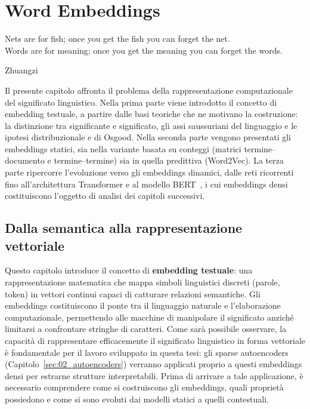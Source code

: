 \newpage

\section{Word Embeddings}
\label{sec:03_word_embeddings}
\epigraph{
    Nets are for fish; once you get the fish you can forget the net.\\
    Words are for meaning; once you get the meaning you can forget the words.
}{Zhuangzi}
Il presente capitolo affronta il problema della rappresentazione computazionale del significato linguistico. Nella prima parte viene introdotto il concetto di embedding testuale, a partire dalle basi teoriche che ne motivano la costruzione: la distinzione tra significante e significato, gli assi saussuriani del linguaggio e le ipotesi distribuzionale e di Osgood. Nella seconda parte vengono presentati gli embeddings statici, sia nella variante basata su conteggi (matrici termine--documento e termine--termine) sia in quella predittiva (Word2Vec). La terza parte ripercorre l'evoluzione verso gli embeddings dinamici, dalle reti ricorrenti fino all'architettura Transformer e al modello BERT~\parencite{devlin2018bert}, i cui embeddings densi costituiscono l'oggetto di analisi dei capitoli successivi.

\newpage

\subsection{Dalla semantica alla rappresentazione vettoriale}
\label{sec:semantics_to_vectors}

Questo capitolo introduce il concetto di \textbf{embedding testuale}: una rappresentazione matematica che mappa simboli linguistici discreti (parole, token) in vettori continui capaci di catturare relazioni semantiche. Gli embeddings costituiscono il ponte tra il linguaggio naturale e l'elaborazione computazionale, permettendo alle macchine di manipolare il significato anziché limitarsi a confrontare stringhe di caratteri.
Come sarà possibile osservare, la capacità di rappresentare efficacemente il significato linguistico in forma vettoriale è fondamentale per il lavoro sviluppato in questa tesi: gli sparse autoencoders (Capitolo~\ref{sec:02_autoencoders}) verranno applicati proprio a questi embeddings densi per estrarne strutture interpretabili. Prima di arrivare a tale applicazione, è necessario comprendere come si costruiscono gli embeddings, quali proprietà possiedono e come si sono evoluti dai modelli statici a quelli contestuali.

